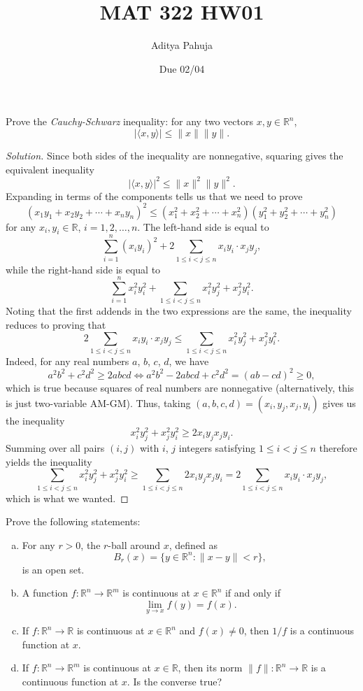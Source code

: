 \documentclass[11pt]{scrartcl}
\title{\vspace{-2em}MAT 322 HW01}
\author{\large Aditya Pahuja}
\date{\large Due 02/04}
\providecommand{\RR}{\mathbb R}
\providecommand{\ii}{\item}
\newenvironment{soln}{\begin{proof}[Solution]}{\end{proof}}
\begin{document}
\maketitle

\begin{problem}
	Prove the \emph{Cauchy-Schwarz} inequality:
	for any two vectors $x,y\in\RR^n$,
	\[|\langle x,y\rangle| \le \|x\|\|y\|.\]
\end{problem}

\begin{soln}
	Since both sides of the inequality are nonnegative,
	squaring gives the equivalent inequality
	\[|\langle x,y\rangle|^2 \le
	\|x\|^2\|y\|^2.\]
	Expanding in terms of the components tells us that we need to prove
	\[(x_1y_1 + x_2y_2 + \cdots + x_ny_n)^2 \le
	(x_1^2 + x_2^2 + \cdots + x_n^2)(y_1^2 + y_2^2 + \cdots + y_n^2)\]
	for any $x_i,y_i\in\RR$, $i=1,2,\dots,n$.
	The left-hand side is equal to
	\[\sum_{i=1}^n (x_iy_i)^2 + 2\sum_{1\le i<j\le n} x_iy_i\cdot x_jy_j,\]
	while the right-hand side is equal to
	\[\sum_{i=1}^n x_i^2 y_i^2 + \sum_{1\le i<j\le n} x_i^2y_j^2 + x_j^2y_i^2.\]
	Noting that the first addends in the two expressions are the same,
	the inequality reduces to proving that
	\[2\sum_{1\le i<j\le n} x_iy_i\cdot x_jy_j\le
	\sum_{1\le i<j\le n} x_i^2y_j^2 + x_j^2y_i^2.\]
	Indeed, for any real numbers $a$, $b$, $c$, $d$, we have
	\[a^2b^2 + c^2d^2 \ge 2abcd
	\iff a^2b^2 - 2abcd + c^2d^2 = (ab-cd)^2 \ge 0,\]
	which is true because squares of real numbers are nonnegative
	(alternatively, this is just two-variable AM-GM).
	Thus, taking $(a,b,c,d) = (x_i,y_j,x_j,y_i)$ gives us the inequality
	\[x_i^2y_j^2 + x_j^2y_i^2 \ge 2x_iy_jx_jy_i.\]
	Summing over all pairs $(i,j)$ with $i$, $j$ integers satisfying
	$1\le i<j\le n$ therefore yields the inequality
	\[\sum_{1\le i<j\le n} x_i^2y_j^2 + x_j^2y_i^2 \ge
	\sum_{1\le i<j\le n} 2x_iy_jx_jy_i =
	2\sum_{1\le i<j\le n} x_iy_i\cdot x_jy_j,\]
	which is what we wanted.
\end{soln}

\pagebreak
\begin{problem}
	Prove the following statements:
	\begin{enumerate}[(a)]
		\ii For any $r>0$, the $r$-ball around $x$, defined as
		\[B_r(x) = \{y\in\RR^n : \|x-y\| < r\},\]
		is an open set.
		\ii A function $f\colon\RR^n\to\RR^m$ is continuous at $x\in\RR^n$
		if and only if
		\[\lim_{y\to x} f(y) = f(x).\]
		\ii If $f\colon\RR^n\to\RR$ is continuous at $x\in\RR^n$
		and $f(x)\ne0$, then $1/f$ is a continuous function at $x$.
		\ii If $f\colon\RR^n\to\RR^m$ is continuous at $x\in\RR$,
		then its norm $\|f\|\colon\RR^n\to\RR$
		is a continuous function at $x$. Is the converse true?
	\end{enumerate}
\end{problem}
\end{document}
